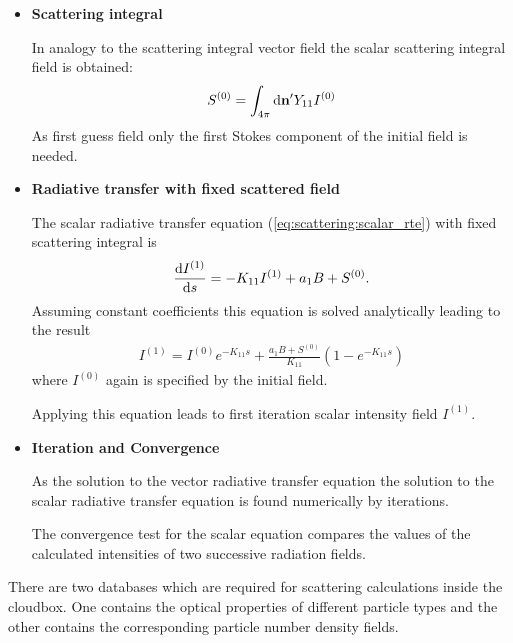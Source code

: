 \label{sec:scattering:solution_rte_scalar}

\begin{itemize}
\item {\bf Scattering integral}

In analogy to the scattering integral vector field the scalar
scattering integral field is obtained:
\begin{eqnarray}
  S^{(0)}  = \int_{4\pi} \mathrm{d} {\bf n}^\prime Y_{11} I^{(0)} 
\end{eqnarray}
As first guess field only the first Stokes component of the initial
field is needed.

\item{\bf Radiative transfer with fixed scattered field}

The scalar radiative transfer equation
(\ref{eq:scattering:scalar_rte})  with fixed scattering integral
is 
\begin{eqnarray}
  \label{eq:scattering:scalar_rte_scatint}
\frac{\mathrm{d} I^{(1)}}{\mathrm{d} s} = -K_{11} I^{(1)}
 + a_1 B + S^{(0)}.
\end{eqnarray} 
Assuming constant coefficients this equation is solved analytically
leading to the result
\begin{eqnarray}
   \label{eq:scattering:scalar_rte_sol}
I^{(1)} = I^{(0)} e^{-K_{11}s} + \frac{a_1
  B + S^{(0)}}{K_{11}}\left(1-e^{-K_{11}s}\right)
\end{eqnarray}
where $I^{(0)}$ again is specified by the initial field.

Applying this equation leads to first iteration scalar intensity
field  $I^{(1)}$.  

\item{\bf Iteration and Convergence}

As the solution to the vector radiative transfer
equation the solution to the scalar radiative transfer equation is
found numerically by iterations. 

The convergence test for the scalar equation compares the values
of the calculated intensities of two successive radiation fields.

\end{itemize}
\label{sec:scattering:database}

There are two databases which are required for scattering calculations
inside the cloudbox. One contains the optical properties of different
particle types and the other contains the corresponding particle
number density fields.

